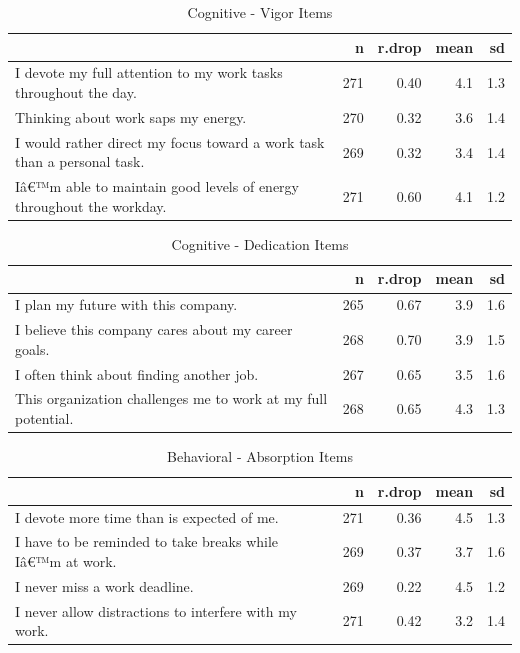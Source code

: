 \documentclass[
]{book}
\begin{document}
\begin{table}

\caption{\label{tab:rdrop11}Cognitive - Vigor Items}
\centering
\begin{tabular}[t]{l|r|r|r|r}
\hline
  & n & r.drop & mean & sd\\
\hline
I devote my full attention to my work tasks throughout the day. & 271 & 0.40 & 4.1 & 1.3\\
\hline
Thinking about work saps my energy. & 270 & 0.32 & 3.6 & 1.4\\
\hline
I would rather direct my focus toward a work task than a personal task. & 269 & 0.32 & 3.4 & 1.4\\
\hline
Iâ€™m able to maintain good levels of energy throughout the workday. & 271 & 0.60 & 4.1 & 1.2\\
\hline
\end{tabular}
\end{table}

\begin{table}

\caption{\label{tab:rdrop12}Cognitive - Dedication Items}
\centering
\begin{tabular}[t]{l|r|r|r|r}
\hline
  & n & r.drop & mean & sd\\
\hline
I plan my future with this company. & 265 & 0.67 & 3.9 & 1.6\\
\hline
I believe this company cares about my career goals. & 268 & 0.70 & 3.9 & 1.5\\
\hline
I often think about finding another job. & 267 & 0.65 & 3.5 & 1.6\\
\hline
This organization challenges me to work at my full potential. & 268 & 0.65 & 4.3 & 1.3\\
\hline
\end{tabular}
\end{table}

\begin{table}

\caption{\label{tab:rdrop13}Behavioral - Absorption Items}
\centering
\begin{tabular}[t]{l|r|r|r|r}
\hline
  & n & r.drop & mean & sd\\
\hline
I devote more time than is expected of me. & 271 & 0.36 & 4.5 & 1.3\\
\hline
I have to be reminded to take breaks while Iâ€™m at work. & 269 & 0.37 & 3.7 & 1.6\\
\hline
I never miss a work deadline. & 269 & 0.22 & 4.5 & 1.2\\
\hline
I never allow distractions to interfere with my work. & 271 & 0.42 & 3.2 & 1.4\\
\hline
\end{tabular}
\end{table}
\end{document}
